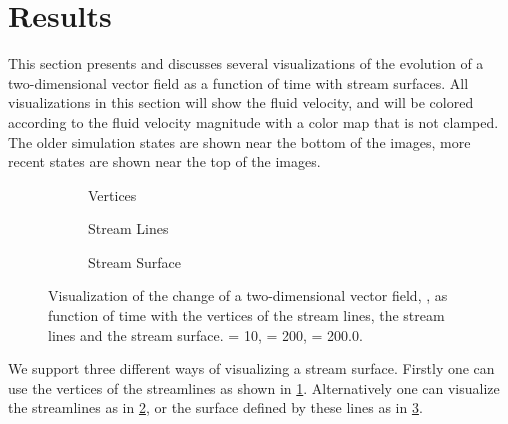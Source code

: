 \section{Results}
\label{s:streamsurfaces:results}
This section presents and discusses several visualizations of the evolution of a two-dimensional vector field as a function of time with stream surfaces. All visualizations in this section will show the fluid velocity, and will be colored according to the fluid velocity magnitude with a color map that is not clamped. The older simulation states are shown near the bottom of the images, more recent states are shown near the top of the images.

\begin{figure}
	\centering
	\begin{subfigure}{0.7\textwidth}
		\centering
		\caption{Vertices}
		\label{fig:streamsurfaces:differentmethods:vertices}
	\end{subfigure}
	\begin{subfigure}{0.7\textwidth}
		\centering
		\caption{Stream Lines}
		\label{fig:streamsurfaces:differentmethods:lines}
	\end{subfigure}	
	\begin{subfigure}{0.7\textwidth}
		\centering
		\caption{Stream Surface}
		\label{fig:streamsurfaces:differentmethods:surface}
	\end{subfigure}		
	\caption{Visualization of the change of a two-dimensional vector field, \velocity, as function of time with  the vertices of the stream lines,  the stream lines and  the stream surface. %
	\resolution = 10, \numStates = 200, \divergenceCriterion = 200.0.}
	\label{fig:streamsurfaces:differentmethods}
\end{figure}

We support three different ways of visualizing a stream surface. Firstly one can use the vertices of the streamlines as shown in \cref{fig:streamsurfaces:differentmethods:vertices}. Alternatively one can visualize the streamlines as in \cref{fig:streamsurfaces:differentmethods:lines}, or the surface defined by these lines as in \cref{fig:streamsurfaces:differentmethods:surface}. 

